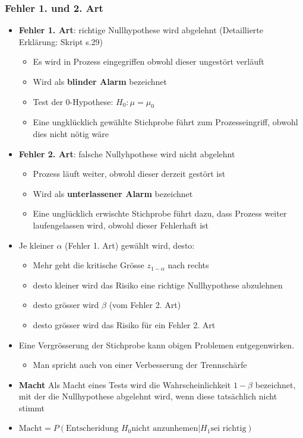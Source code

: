 \subsubsection{Fehler 1. und 2. Art}
\begin{itemize}
	\item \textbf{Fehler 1. Art}: richtige Nullhypothese wird abgelehnt (Detaillierte Erklärung: Skript s.29) 
	\begin{itemize}
		\item Es wird in Prozess eingegriffen obwohl dieser ungestört verläuft
		\item Wird als \textbf{blinder Alarm} bezeichnet
		\item Test der 0-Hypothese: $H_0:\mu=\mu_0$  
		\item Eine ungklücklich gewählte Stichprobe führt zum Prozesseingriff, obwohl dies nicht nötig wäre
	\end{itemize}
	\item \textbf{Fehler 2. Art}: falsche Nullyhpothese wird nicht abgelehnt
	\begin{itemize}
		\item Prozess läuft weiter, obwohl dieser derzeit gestört ist
		\item Wird als \textbf{unterlassener Alarm} bezeichnet
		\item Eine unglücklich erwischte Stichprobe führt dazu, dass Prozess weiter laufengelassen wird, obwohl dieser Fehlerhaft ist
	\end{itemize}
	\item Je kleiner $\alpha$ (Fehler 1. Art) gewählt wird, desto:
	\begin{itemize}
		\item Mehr geht die kritische Grösse $z_{1-\alpha}$ nach rechts
		\item desto kleiner wird das Risiko eine richtige Nullhypothese abzulehnen
		\item desto grösser wird $\beta$ (vom Fehler 2. Art) 
		\item desto grösser wird das Risiko für ein Fehler 2. Art
	\end{itemize}
	\item Eine Vergrösserung der Stichprobe kann obigen Problemen entgegenwirken. 
	\begin{itemize}
		\item Man spricht auch von einer Verbesserung der Trennschärfe
	\end{itemize}
	\item \textbf{Macht} Als Macht eines Tests wird die Wahrscheinlichkeit $1-\beta$ bezeichnet, mit der die Nullhypothese abgelehnt wird, wenn diese tatsächlich nicht stimmt
	\item  $\text{Macht} = P\left(\text{Entscheridung }H_0\text{nicht anzunhemen}\vert H_1 \text{sei richtig}\right)$
\end{itemize}

